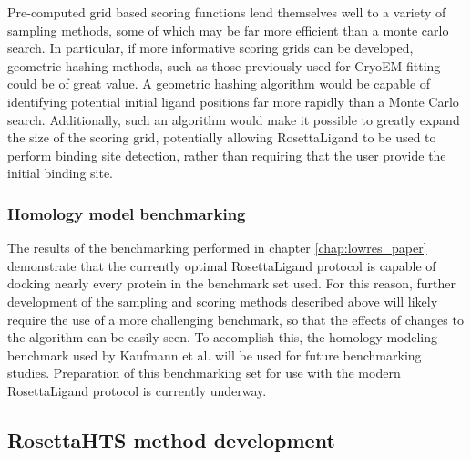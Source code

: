 Pre-computed grid based scoring functions lend themselves well to a variety of sampling methods, some of which may be far more efficient than a monte carlo search.
In particular, if more informative scoring grids can be developed, geometric hashing methods, such as those previously used for CryoEM fitting \citep{Woetzel:2011id} could be of great value.
A geometric hashing algorithm would be capable of identifying potential initial ligand positions far more rapidly than a Monte Carlo search.
Additionally, such an algorithm would make it possible to greatly expand the size of the scoring grid, potentially allowing RosettaLigand to be used to perform binding site detection, rather than requiring that the user provide the initial binding site. 

\subsubsection{Homology model benchmarking}

The results of the benchmarking performed in chapter \ref{chap:lowres_paper} demonstrate that the currently optimal RosettaLigand protocol is capable of docking nearly every protein in the benchmark set used.
For this reason, further development of the sampling and scoring methods described above will likely require the use of a more challenging benchmark, so that the effects of changes to the algorithm can be easily seen. 
To accomplish this, the homology modeling benchmark used by Kaufmann et al. \citep{Kaufmann:2012ck} will be used for future benchmarking studies.
Preparation of this benchmarking set for use with the modern RosettaLigand protocol is currently underway.

\subsection{RosettaHTS method development}
\label{subsec:hts_further_development}
